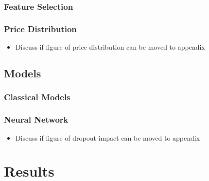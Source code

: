 \documentclass[12pt, letterpaper]{article}
\begin{document}
\subsubsection{Feature Selection} %


\subsubsection{Price Distribution} %

\begin{itemize}
    \item Discuss if figure of price distribution can be moved to appendix
\end{itemize}



\subsection{Models} %

\subsubsection{Classical Models} %

\subsubsection{Neural Network} %

\begin{itemize}
    \item Discuss if figure of dropout impact can be moved to appendix
\end{itemize}



\section{Results} %

\end{document}
